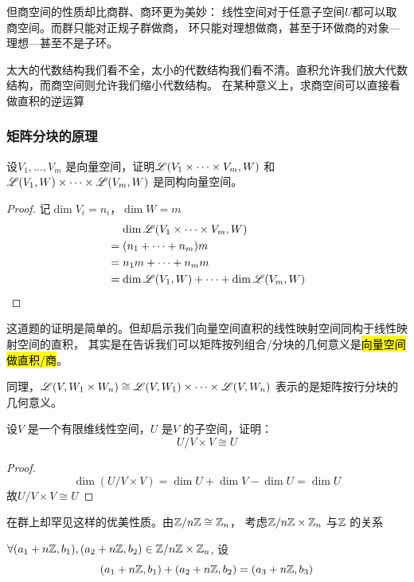 但商空间的性质却比商群、商环更为美妙： 线性空间对于任意子空间\(U\)都可以取商空间。而群只能对正规子群做商，
环只能对理想做商，甚至于环做商的对象---理想---甚至不是子环。

太大的代数结构我们看不全，太小的代数结构我们看不清。直积允许我们放大代数结构，而商空间则允许我们缩小代数结构。
在某种意义上，求商空间可以直接看做直积的逆运算

\subsubsection{矩阵分块的原理}
\begin{problem}[矩阵分块]
    设\(V_1,\dots ,V_{m}\) 是向量空间，证明\(\mathscr{L}(V_1\times
    \dots \times V_{m},W)\) 和\(\mathscr{L}(V_1,W)\times \dots
    \times \mathscr{L}(V_{m},W)\) 是同构向量空间。
\end{problem}

\begin{proof}
    记\(\dim V_{i}=n_{i}\)，\(\dim W=m\)
    \begin{align*}
        &\placeholder{=}\dim \L(V_{1} \times
        \dots \times V_{m}, W) \\
        &= (n_1+\dots+n_{m})m \\
        &= n_{1}m + \dots + n_{m}m \\
        &= \dim \L(V_{1},W) + \dots +
        \dim \L(V_{m},W)
    \end{align*}
\end{proof}
这道题的证明是简单的。但却启示我们向量空间直积的线性映射空间同构于线性映射空间的直积，
其实是在告诉我们可以矩阵按列组合/分块的几何意义是\hl{向量空间做直积/商}。

同理，\(\mathscr{L}(V,W_1\times W_{n})\cong
    \mathscr{L}(V,W_1)\times \dots \times
\mathscr{L}(V,W_{n})\) 表示的是矩阵按行分块的几何意义。

\begin{problem}[线性空间分解]
    设\(V\) 是一个有限维线性空间，\(U\) 是\(V\) 的子空间，证明：
    \[
        U/V \times V \cong U
    \]
\end{problem}

\begin{proof}
    \[
        \dim (U/V \times V) = \dim U + \dim V - \dim U = \dim U
    \]
    故\(U/V \times V \cong U\)
\end{proof}

在群上却罕见这样的优美性质。由\(\mathbb{Z}/n\mathbb{Z} \cong
\mathbb{Z}_{n}\)，
考虑\(\mathbb{Z}/n\mathbb{Z}\times\mathbb{Z}_{n}\) 与\(\mathbb{Z}\) 的关系

\(\forall (a_1+n\mathbb{Z}, b_1),(a_2+n\mathbb{Z}, b_2) \in
\mathbb{Z}/n\mathbb{Z} \times \mathbb{Z}_{n}\), 设\[
    (a_1+n\mathbb{Z}, b_1)+(a_2+n\mathbb{Z}, b_2) =
    (a_3+n\mathbb{Z}, b_3)
\]

